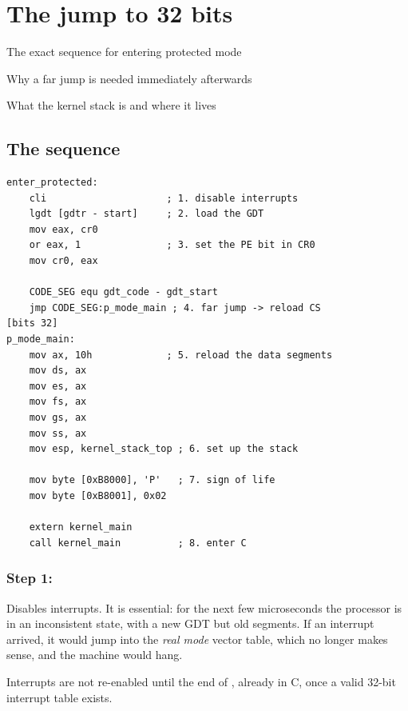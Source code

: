 \chapter{The jump to 32 bits}

\begin{goals}
  \item The exact sequence for entering protected mode
  \item Why a far jump is needed immediately afterwards
  \item What the kernel stack is and where it lives
\end{goals}

\section{The sequence}

\begin{lstlisting}[style=asm]
enter_protected:
    cli                     ; 1. disable interrupts
    lgdt [gdtr - start]     ; 2. load the GDT
    mov eax, cr0
    or eax, 1               ; 3. set the PE bit in CR0
    mov cr0, eax

    CODE_SEG equ gdt_code - gdt_start
    jmp CODE_SEG:p_mode_main ; 4. far jump -> reload CS
[bits 32]
p_mode_main:
    mov ax, 10h             ; 5. reload the data segments
    mov ds, ax
    mov es, ax
    mov fs, ax
    mov gs, ax
    mov ss, ax
    mov esp, kernel_stack_top ; 6. set up the stack

    mov byte [0xB8000], 'P'   ; 7. sign of life
    mov byte [0xB8001], 0x02

    extern kernel_main
    call kernel_main          ; 8. enter C
\end{lstlisting}

\subsection{Step 1: }

Disables interrupts. It is essential: for the next few microseconds the processor is in an
inconsistent state, with a new GDT but old segments. If an interrupt arrived, it would jump into
the \emph{real mode} vector table, which no longer makes sense, and the machine would hang.

Interrupts are not re-enabled until the end of , already in C, once a valid 32-bit
interrupt table exists.

